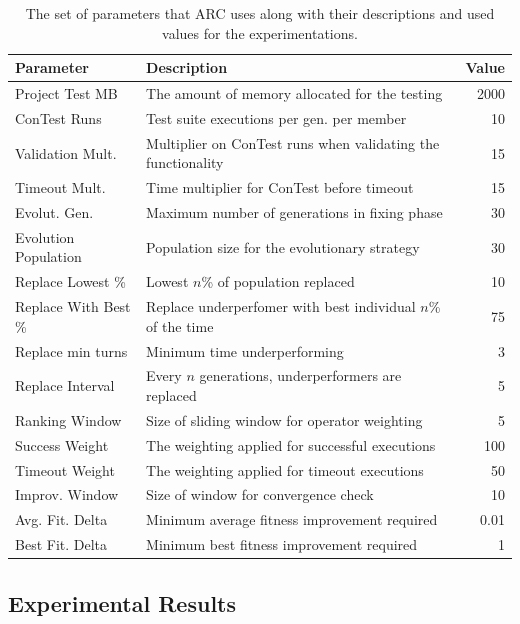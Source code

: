 \documentclass{llncs}
\begin{document}
\begin{table}%
\caption{The set of parameters that ARC uses along with their descriptions and
used values for the experimentations.}
\begin{center}
\lstset{basicstyle=\scriptsize}
\begin{tabular}{|l|l|r|}
\hline
\textbf{Parameter} & \textbf{Description} & \textbf{Value}\\
\hline
Project Test MB & The amount of memory allocated for the testing & 2000\\
\hline
ConTest Runs & Test suite executions per gen. per member & 10\\
\hline
Validation Mult. & Multiplier on ConTest runs when validating the functionality & 15\\
\hline
Timeout Mult. & Time multiplier for ConTest before timeout & 15\\
\hline
Evolut. Gen. & Maximum number of generations in fixing phase & 30\\
\hline
Evolution Population & Population size for the evolutionary strategy & 30\\
\hline
Replace Lowest \% & Lowest $n$\% of population replaced & 10\\
\hline
Replace With Best \% & Replace underperfomer with best individual $n$\% of the time & 75\\
\hline
Replace min turns & Minimum time underperforming & 3\\
\hline
Replace Interval & Every $n$ generations, underperformers are replaced & 5\\
\hline
Ranking Window & Size of sliding window for operator weighting & 5\\
\hline
Success Weight & The weighting applied for successful executions & 100\\
\hline
Timeout Weight & The weighting applied for timeout executions & 50\\
\hline
Improv. Window & Size of window for convergence check & 10\\
\hline
Avg. Fit. Delta & Minimum average fitness improvement required & 0.01\\
\hline
Best Fit. Delta & Minimum best fitness improvement required & 1\\
\hline
\end{tabular}
\label{tbl:used_parameters}
\end{center}
\end{table}

\subsection{Experimental Results}
\label{sec:experimental_results}
\end{document}
